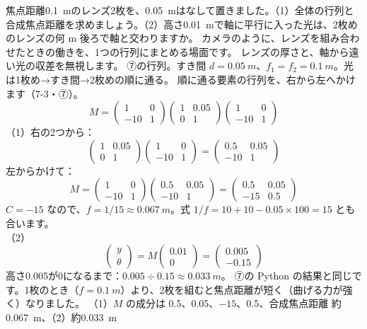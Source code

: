 \label{ph:波-12:ex9}
\begin{phreidai}[2枚のレンズを行列で]
焦点距離\qty{0.1}{m}のレンズ2枚を、\qty{0.05}{m}はなして置きました。（1）全体の行列と合成焦点距離を求めましょう。（2）高さ\qty{0.01}{m}で軸に平行に入った光は、2枚めのレンズの何 m 後ろで軸と交わりますか。
\phbamen
カメラのように、レンズを組み合わせたときの働きを、1つの行列にまとめる場面です。
\phmushi
レンズの厚さと、軸から遠い光の収差を無視します。
\phzu
⑦の行列。すき間 $d=\qty{0.05}{m}$、$f_1=f_2=\qty{0.1}{m}$。光は1枚め→すき間→2枚めの順に通る。
\phriyu
順に通る要素の行列を、右から左へかけます（7-3・⑦）。
\phtateru
\[M=\begin{pmatrix}1&0\\-10&1\end{pmatrix}\begin{pmatrix}1&0.05\\0&1\end{pmatrix}\begin{pmatrix}1&0\\-10&1\end{pmatrix}\]
\phtoku
（1）右の2つから：\[\begin{pmatrix}1&0.05\\0&1\end{pmatrix}\begin{pmatrix}1&0\\-10&1\end{pmatrix}=\begin{pmatrix}0.5&0.05\\-10&1\end{pmatrix}\]
左からかけて：\[M=\begin{pmatrix}1&0\\-10&1\end{pmatrix}\begin{pmatrix}0.5&0.05\\-10&1\end{pmatrix}=\begin{pmatrix}0.5&0.05\\-15&0.5\end{pmatrix}\]
$C=-15$ なので、$f=1/15\approx\qty{0.067}{m}$。式 $1/f=10+10-0.05\times100=15$ とも合います。\\
（2）\[\begin{pmatrix}y\\\theta\end{pmatrix}=M\begin{pmatrix}0.01\\0\end{pmatrix}=\begin{pmatrix}0.005\\-0.15\end{pmatrix}\]
高さ0.005が0になるまで：$0.005\div0.15\approx\qty{0.033}{m}$。
\phtashikame
⑦の Python の結果と同じです。1枚のとき（$f=\qty{0.1}{m}$）より、2枚を組むと焦点距離が短く（曲げる力が強く）なりました。
\kotae （1）$M$ の成分は 0.5、0.05、$-15$、0.5、合成焦点距離 約\qty{0.067}{m}、（2）約\qty{0.033}{m}
\end{phreidai}
